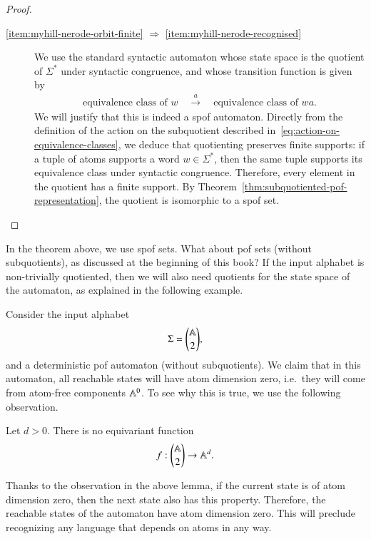\begin{proof}
\begin{description}
        \item[\ref{item:myhill-nerode-orbit-finite} $\Rightarrow$
        \ref{item:myhill-nerode-recognised}] We use the standard syntactic automaton whose state space is the quotient of $\Sigma^*$ under syntactic congruence, and whose transition function is given by 
        \begin{align*}
        \text{equivalence class of $w$} 
        \quad 
        \stackrel{a}{\longrightarrow}
        \quad
        \text{equivalence class of $wa$}.
        \end{align*}
        We will justify that this is indeed a spof automaton. 
        Directly from the definition of the action on the subquotient described in~\eqref{eq:action-on-equivalence-classes}, we deduce that quotienting preserves finite supports: if a tuple of atoms  supports a word $w \in \Sigma^*$,  then the same tuple supports its equivalence class  under syntactic congruence. Therefore, every element in the quotient has a finite support. By Theorem~\ref{thm:subquotiented-pof-representation}, the quotient is isomorphic to a spof set. 
    \end{description}
\end{proof}

In the theorem above, we use spof sets. What about pof sets (without subquotients), as discussed at the beginning of this book? If the input alphabet is non-trivially quotiented, then we will also need quotients for the state space of the automaton, as explained in the following example.

\begin{myexample}
    Consider the input alphabet 
    \begin{align*}
        \Sigma = {\mathbb A \choose 2},
        \end{align*}
    and a deterministic pof automaton (without subquotients). We claim that in this automaton, all reachable states will have atom dimension zero, i.e.~they will come from atom-free components $\mathbb A^0$.   To see why this is true, we use the following observation.
    \begin{lemma}\label{lem:no-choice}
        Let $d > 0$. 
        There is no equivariant function 
        \begin{align*}
        f : {\mathbb A \choose 2} \to \mathbb A^d.
        \end{align*}
    \end{lemma}
    Thanks to the observation in the above lemma, if the current state is of atom dimension zero, then the next state also has this property. Therefore, the reachable states of the automaton have atom dimension zero. This will preclude recognizing any language that depends on atoms in any way.
\end{myexample}

